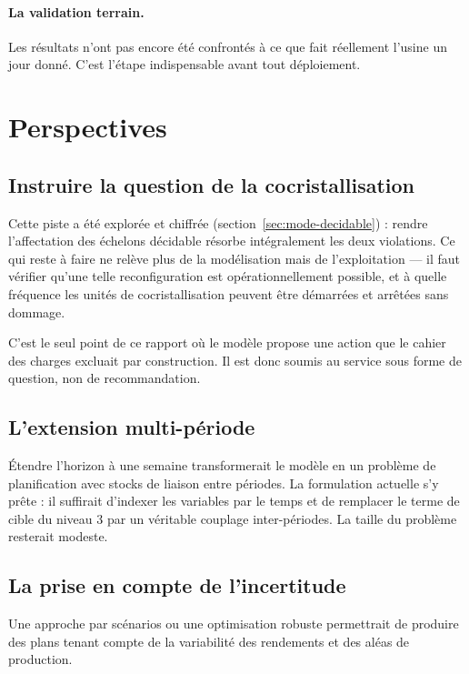 \paragraph{La validation terrain.} Les résultats n'ont pas encore été confrontés à ce que
fait réellement l'usine un jour donné. C'est l'étape indispensable avant tout déploiement.

\section{Perspectives}

\subsection{Instruire la question de la cocristallisation}

Cette piste a été explorée et chiffrée (section~\ref{sec:mode-decidable}) : rendre
l'affectation des échelons décidable résorbe intégralement les deux violations. Ce qui reste
à faire ne relève plus de la modélisation mais de l'exploitation --- il faut vérifier qu'une
telle reconfiguration est opérationnellement possible, et à quelle fréquence les unités de
cocristallisation peuvent être démarrées et arrêtées sans dommage.

C'est le seul point de ce rapport où le modèle propose une action que le cahier des charges
excluait par construction. Il est donc soumis au service sous forme de question, non de
recommandation.

\subsection{L'extension multi-période}

Étendre l'horizon à une semaine transformerait le modèle en un problème de planification
avec stocks de liaison entre périodes. La formulation actuelle s'y prête : il suffirait
d'indexer les variables par le temps et de remplacer le terme de cible du niveau 3 par un
véritable couplage inter-périodes. La taille du problème resterait modeste.

\subsection{La prise en compte de l'incertitude}

Une approche par scénarios ou une optimisation robuste permettrait de produire des plans
tenant compte de la variabilité des rendements et des aléas de production.

